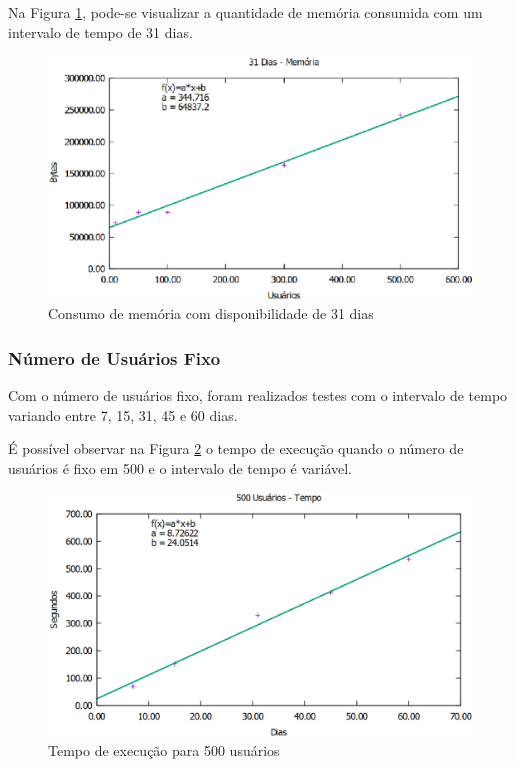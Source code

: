 Na Figura \ref{31dias_memoria}, pode-se visualizar a quantidade de memória consumida com um intervalo de tempo de 31 dias.

\begin{figure}[!h]
	\centering
	\includegraphics[scale=0.55]{figuras/resultados/graficos/31_dias_memoria.eps}
	\caption[Consumo de memória com disponibilidade de 31 dias]{Consumo de memória com disponibilidade de 31 dias}
	\label{31dias_memoria}
\end{figure}

\subsubsection{Número de Usuários Fixo}

Com o número de usuários fixo, foram realizados testes com o intervalo de tempo variando entre 7, 15, 31, 45 e 60 dias.

É possível observar na Figura \ref{500users_tempo} o tempo de execução quando o número de usuários é fixo em 500 e o intervalo de tempo é variável.

\begin{figure}[!h]
	\centering
	\includegraphics[scale=0.55]{figuras/resultados/graficos/500_users_tempo.eps}
	\caption[Tempo de execução para 500 usuários]{Tempo de execução para 500 usuários}
	\label{500users_tempo}
\end{figure}

